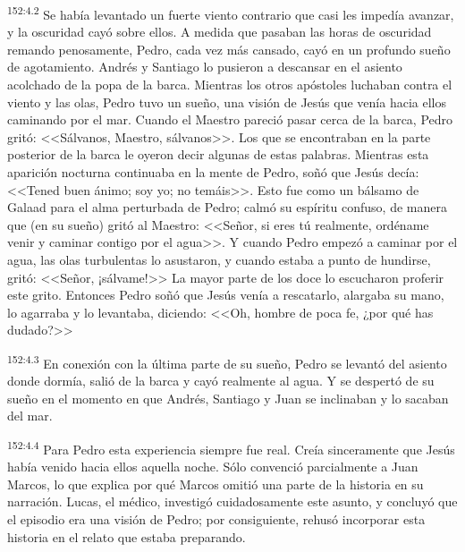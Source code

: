 \par 
\textsuperscript{152:4.2} Se había levantado un fuerte viento contrario que casi les impedía avanzar, y la oscuridad cayó sobre ellos. A medida que pasaban las horas de oscuridad remando penosamente, Pedro, cada vez más cansado, cayó en un profundo sueño de agotamiento. Andrés y Santiago lo pusieron a descansar en el asiento acolchado de la popa de la barca. Mientras los otros apóstoles luchaban contra el viento y las olas, Pedro tuvo un sueño, una visión de Jesús que venía hacia ellos caminando por el mar. Cuando el Maestro pareció pasar cerca de la barca, Pedro gritó: <<Sálvanos, Maestro, sálvanos>>. Los que se encontraban en la parte posterior de la barca le oyeron decir algunas de estas palabras. Mientras esta aparición nocturna continuaba en la mente de Pedro, soñó que Jesús decía: <<Tened buen ánimo; soy yo; no temáis>>. Esto fue como un bálsamo de Galaad para el alma perturbada de Pedro; calmó su espíritu confuso, de manera que (en su sueño) gritó al Maestro: <<Señor, si eres tú realmente, ordéname venir y caminar contigo por el agua>>. Y cuando Pedro empezó a caminar por el agua, las olas turbulentas lo asustaron, y cuando estaba a punto de hundirse, gritó: <<Señor, ¡sálvame!>> La mayor parte de los doce lo escucharon proferir este grito. Entonces Pedro soñó que Jesús venía a rescatarlo, alargaba su mano, lo agarraba y lo levantaba, diciendo: <<Oh, hombre de poca fe, ¿por qué has dudado?>>

\par 
\textsuperscript{152:4.3} En conexión con la última parte de su sueño, Pedro se levantó del asiento donde dormía, salió de la barca y cayó realmente al agua. Y se despertó de su sueño en el momento en que Andrés, Santiago y Juan se inclinaban y lo sacaban del mar.

\par 
\textsuperscript{152:4.4} Para Pedro esta experiencia siempre fue real. Creía sinceramente que Jesús había venido hacia ellos aquella noche. Sólo convenció parcialmente a Juan Marcos, lo que explica por qué Marcos omitió una parte de la historia en su narración. Lucas, el médico, investigó cuidadosamente este asunto, y concluyó que el episodio era una visión de Pedro; por consiguiente, rehusó incorporar esta historia en el relato que estaba preparando.

